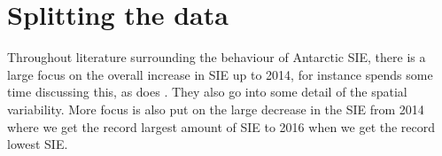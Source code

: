 \section{Splitting the data}
Throughout literature surrounding the behaviour of Antarctic SIE, there is a large focus on the overall increase in SIE up to 2014, \cite{Parkinson2019} for instance spends some time discussing this, as does \cite{Yuan2017}. They also go into some detail of the spatial variability. More focus is also put on the large decrease in the SIE from 2014 where we get the record largest amount of SIE to 2016 when we get the record lowest SIE. \cite{Meehl2018}